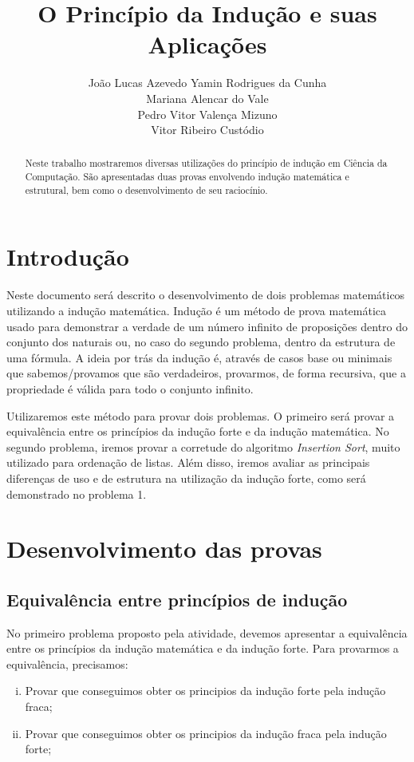 \documentclass[a4paper, 10pt]{article}
\title{\LARGE \bf
O Princípio da Indução e suas Aplicações
}
\author{João Lucas Azevedo Yamin Rodrigues da Cunha \\
		Mariana Alencar do Vale \\
        Pedro Vitor Valença Mizuno \\
        Vitor Ribeiro Custódio}
\begin{document}
\maketitle

\begin{abstract}

Neste trabalho mostraremos diversas utilizações do princípio de indução em Ciência da Computação. São apresentadas duas provas envolvendo indução matemática e estrutural, bem como o desenvolvimento de seu raciocínio.\par

\end{abstract}

\section{Introdução}

Neste documento será descrito o desenvolvimento de dois problemas matemáticos utilizando a indução matemática. Indução é um método de prova matemática usado para demonstrar a verdade de um número infinito de proposições dentro do conjunto dos naturais ou, no caso do segundo problema, dentro da estrutura de uma fórmula. A ideia por trás da indução é, através de casos base ou minimais que sabemos/provamos que são verdadeiros, provarmos, de forma recursiva, que a propriedade é válida para todo o conjunto infinito. 

Utilizaremos este método para provar dois problemas. O primeiro será provar a equivalência entre os princípios da indução forte e da indução matemática. No segundo problema, iremos provar a corretude do algoritmo \textit{Insertion Sort}, muito utilizado para ordenação de listas. Além disso, iremos avaliar as principais diferenças de uso e de estrutura na utilização da indução forte, como será demonstrado no problema 1.

\section{Desenvolvimento das provas}

\subsection{Equivalência entre princípios de indução}


 No primeiro problema proposto pela atividade, devemos apresentar a equivalência entre os princípios da indução matemática e da indução forte.
	Para provarmos a equivalência, precisamos:
\begin{enumerate}[i)]
\item Provar que conseguimos obter os principios da indução forte pela indução fraca;
\item Provar que conseguimos obter os principios da indução fraca pela indução forte;
\end{enumerate}
\end{document}
